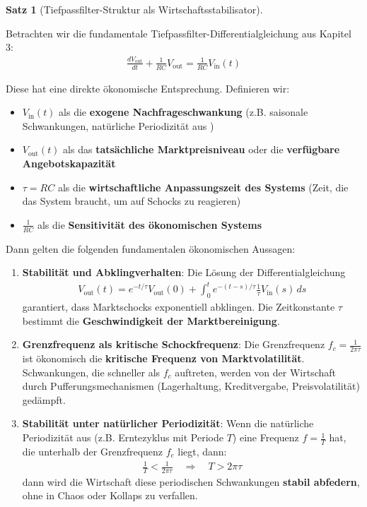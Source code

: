 \documentclass[a4paper,12pt,twoside]{report}
\theoremstyle{definition}
\newtheorem{satz}{Satz}
\begin{document}
\begin{satz}[Tiefpassfilter-Struktur als Wirtschaftsstabilisator]
\label{satz:tiefpass_oekonomie}

Betrachten wir die fundamentale Tiefpassfilter-Differentialgleichung aus Kapitel 3:
\begin{align}
\frac{dV_{\text{out}}}{dt} + \frac{1}{RC} V_{\text{out}} = \frac{1}{RC} V_{\text{in}}(t)
\end{align}

Diese hat eine direkte ökonomische Entsprechung. Definieren wir:
\begin{itemize}
\item $V_{\text{in}}(t)$ als die \textbf{exogene Nachfrageschwankung} (z.B. saisonale Schwankungen, natürliche Periodizität aus \cite{epp_signal})
\item $V_{\text{out}}(t)$ als das \textbf{tatsächliche Marktpreisniveau} oder die \textbf{verfügbare Angebotskapazität}
\item $\tau = RC$ als die \textbf{wirtschaftliche Anpassungszeit des Systems} (Zeit, die das System braucht, um auf Schocks zu reagieren)
\item $\frac{1}{RC}$ als die \textbf{Sensitivität des ökonomischen Systems}
\end{itemize}

Dann gelten die folgenden fundamentalen ökonomischen Aussagen:

\begin{enumerate}

\item \textbf{Stabilität und Abklingverhalten}: Die Lösung der Differentialgleichung
\begin{align}
V_{\text{out}}(t) = e^{-t/\tau} V_{\text{out}}(0) + \int_0^t e^{-(t-s)/\tau} \frac{1}{\tau} V_{\text{in}}(s) \, ds
\end{align}
garantiert, dass Marktschocks exponentiell abklingen. Die Zeitkonstante $\tau$ bestimmt die \textbf{Geschwindigkeit der Marktbereinigung}.

\item \textbf{Grenzfrequenz als kritische Schockfrequenz}: Die Grenzfrequenz $f_c = \frac{1}{2\pi \tau}$ ist ökonomisch die \textbf{kritische Frequenz von Marktvolatilität}. Schwankungen, die schneller als $f_c$ auftreten, werden von der Wirtschaft durch Pufferungsmechanismen (Lagerhaltung, Kreditvergabe, Preisvolatilität) gedämpft.

\item \textbf{Stabilität unter natürlicher Periodizität}: Wenn die natürliche Periodizität aus \cite{epp_signal} (z.B. Erntezyklus mit Periode $T$) eine Frequenz $f = \frac{1}{T}$ hat, die unterhalb der Grenzfrequenz $f_c$ liegt, dann:
\begin{align}
\frac{1}{T} < \frac{1}{2\pi \tau} \quad \Rightarrow \quad T > 2\pi \tau
\end{align}
dann wird die Wirtschaft diese periodischen Schwankungen \textbf{stabil abfedern}, ohne in Chaos oder Kollaps zu verfallen.


\end{enumerate}
\end{satz}
\end{document}
